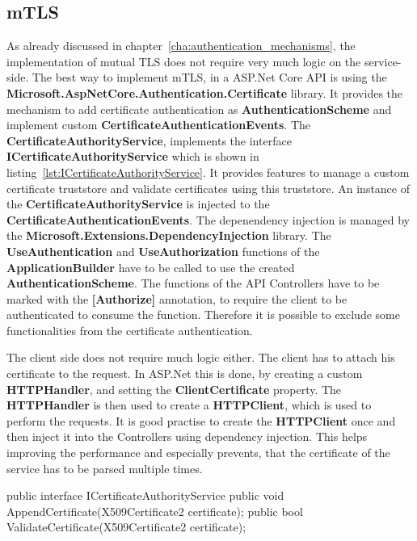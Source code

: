 \subsection{mTLS} \label{sec:impl_details_mtls}
As already discussed in chapter~\ref{cha:authentication_mechanisms}, the implementation of mutual TLS does not require very much logic on the service-side.
The best way to implement mTLS, in a ASP.Net Core API is using the \textbf{Microsoft.AspNetCore.Authentication.Certificate} library.
It provides the mechanism to add certificate authentication as \textbf{AuthenticationScheme} and implement custom \textbf{CertificateAuthenticationEvents}.
The \textbf{CertificateAuthorityService}, implements the interface \textbf{ICertificateAuthorityService} which is shown in listing~\ref{lst:ICertificateAuthorityService}.
It provides features to manage a custom certificate truststore and validate certificates using this truststore.
An instance of the \textbf{CertificateAuthorityService} is injected to the \textbf{CertificateAuthenticationEvents}.
The depenendency injection is managed by the \textbf{Microsoft.Extensions.DependencyInjection} library.
The \textbf{UseAuthentication} and \textbf{UseAuthorization} functions of the \textbf{ApplicationBuilder} have to be called to use the created \textbf{AuthenticationScheme}.
The functions of the API Controllers have to be marked with the \textbf{[Authorize]} annotation, to require the client to be authenticated to consume the function.
Therefore it is possible to exclude some functionalities from the certificate authentication.

The client side does not require much logic either.
The client has to attach his certificate to the request.
In ASP.Net this is done, by creating a custom \textbf{HTTPHandler}, and setting the \textbf{ClientCertificate} property.
The \textbf{HTTPHandler} is then used to create a \textbf{HTTPClient}, which is used to perform the requests.
It is good practise to create the \textbf{HTTPClient} once and then inject it into the Controllers using dependency injection.
This helps improving the performance and especially prevents, that the certificate of the service has to be parsed multiple times.

\noindent \begin{minipage}{\linewidth}
	\begin{CsCode}[label={lst:ICertificateAuthorityService}, caption={ICertificateAuthorityService interface, which is implemented by the injected CertificateAuthorityService},captionpos=b]
		public interface ICertificateAuthorityService {
			public void AppendCertificate(X509Certificate2 certificate);
			public bool ValidateCertificate(X509Certificate2 certificate);
		}
	\end{CsCode}
\end{minipage}

